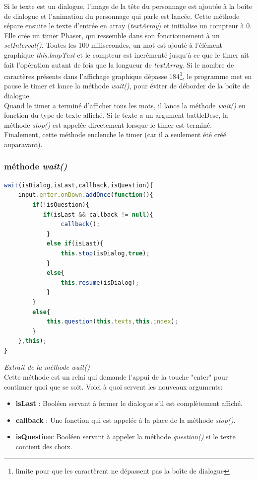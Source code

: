 \documentclass[11pt]{article}
\begin{document}
\begin{appendices}
Si le texte est un dialogue, l'image de la tête du personnage est ajoutée à la boîte de dialogue et l'animation du personnage qui parle est lancée.
Cette méthode sépare ensuite le texte d'entrée en array (\textit{textArray}) et initialise un compteur à 0. Elle crée un timer Phaser, qui ressemble dans son fonctionnement à un \textit{setInterval()}. Toutes les 100 milisecondes, un mot est ajouté à l'élément graphique \textit{this.bmpText} et le compteur est incrémenté jusqu'à ce que le timer ait fait l'opération autant de fois que la longueur de \textit{textArray}. Si le nombre de caractères présents dans l'affichage graphique dépasse 184\footnote{limite pour que les caractèrent ne dépassent pas la boîte de dialogue}, le programme met en pause le timer et lance la méthode \textit{wait()}, pour éviter de déborder de la boîte de dialogue.\\

 Quand le timer a terminé d'afficher tous les mots, il lance la méthode \textit{wait()} en fonction du type de texte affiché. Si le texte a un argument battleDesc, la méthode \textit{stop()} est appelée directement lorsque le timer est terminé.\\
 
Finalement, cette méthode enclenche le timer (car il a seulement été créé auparavant).
 
\subsubsection{méthode \textit{wait()}}
\begin{lstlisting}[language=JavaScript]
wait(isDialog,isLast,callback,isQuestion){ 
    input.enter.onDown.addOnce(function(){ 
    	if(!isQuestion){
     	   if(isLast && callback != null){
       	     	callback();
       	 	}
        	else if(isLast){
            	this.stop(isDialog,true);
        	}
        	else{
            	this.resume(isDialog);
        	}
    	}
    	else{
        	this.question(this.texts,this.index);
    	}
	},this);
}
\end{lstlisting} 
\textit{Extrait de la méthode wait()}\\ Cette méthode est un relai qui demande l'appui de la touche "enter" pour continuer quoi que se soit. Voici à quoi servent les nouveaux arguments: 
\begin{itemize}
\item \textbf{isLast} : Booléen servant à fermer le dialogue s'il est complètement affiché.
\item \textbf{callback} : Une fonction qui est appelée à la place de la méthode \textit{stop()}.
\item \textbf{isQuestion}: Booléen servant à appeler la méthode \textit{question()} si le texte contient des choix.
\end{itemize}

\end{appendices}
\end{document}
